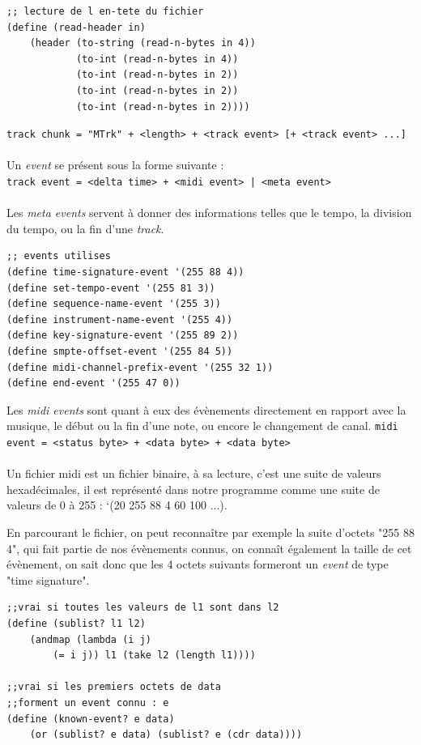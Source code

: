 \begin{lstlisting}[style=Scheme]
;; lecture de l en-tete du fichier
(define (read-header in)
    (header (to-string (read-n-bytes in 4))
            (to-int (read-n-bytes in 4))
            (to-int (read-n-bytes in 2))
            (to-int (read-n-bytes in 2))
            (to-int (read-n-bytes in 2))))
\end{lstlisting}
{\small \texttt{track chunk = "MTrk" + <length> + <track event> [+ <track event> ...]}}\\\\
Un \textit{event} se présent sous la forme suivante :\\
{\small \texttt{track event = <delta time> + <midi event> | <meta event>}}\\\\
Les \textit{meta events} servent à donner des informations telles que le tempo, la division du tempo, ou la fin d'une \textit{track}.\\

\begin{lstlisting}[style=Scheme]
;; events utilises
(define time-signature-event '(255 88 4))
(define set-tempo-event '(255 81 3))
(define sequence-name-event '(255 3))
(define instrument-name-event '(255 4))
(define key-signature-event '(255 89 2))
(define smpte-offset-event '(255 84 5))
(define midi-channel-prefix-event '(255 32 1))
(define end-event '(255 47 0))
\end{lstlisting}

Les \textit{midi events} sont quant à eux des évènements directement en rapport avec la musique, le début ou la fin d'une note, ou encore le changement de canal.
{\small \texttt{midi event = <status byte> + <data byte> + <data byte>}}\\\\
Un fichier midi est un fichier binaire, à sa lecture, c'est une suite de valeurs hexadécimales, il est représenté dans notre programme comme une suite de valeurs de 0 à 255 : ‘(20 255 88 4 60 100 ...).

En parcourant le fichier, on peut reconnaître par exemple la suite d'octets "255 88 4", qui fait partie de nos évènements connus, on connaît également la taille de cet évènement, on sait donc que les 4 octets suivants formeront un \textit{event} de type "time signature".\\

\begin{lstlisting}[style=Scheme]
;;vrai si toutes les valeurs de l1 sont dans l2
(define (sublist? l1 l2)
    (andmap (lambda (i j)
        (= i j)) l1 (take l2 (length l1))))

;;vrai si les premiers octets de data
;;forment un event connu : e
(define (known-event? e data)
    (or (sublist? e data) (sublist? e (cdr data))))
\end{lstlisting}

